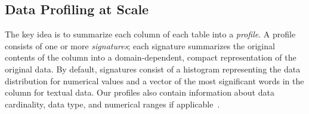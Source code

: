 \subsection{Data Profiling at Scale}

The key idea is to summarize each column of each table into a {\em profile}.
A profile consists of one or more {\it signatures};  each signature summarizes
the original contents of the column into a domain-dependent, compact
representation of the original data.  By default, signatures consist of a
histogram representing the data distribution for numerical values and  a vector
of the most significant words in the column for textual data.  Our profiles also
contain information about data cardinality, data type, and numerical ranges if
applicable~\cite{profiling_survey}.


